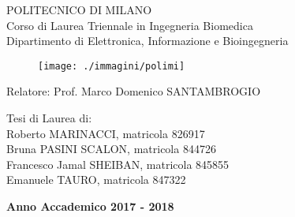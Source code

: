 \documentclass[/../main.tex]{subfiles}
\begin{document}
\thispagestyle{empty}
\vspace*{-2.5cm} %
\vspace*{0.5cm}

\begin{center}
\large
POLITECNICO DI MILANO\\
\normalsize
Corso di Laurea Triennale in Ingegneria Biomedica\\
Dipartimento di Elettronica, Informazione e Bioingegneria

\vspace*{1cm}
\begin{figure}[htbp]
\begin{center}
\texttt{[image: ./immagini/polimi]}
\end{center}
\end{figure}
\vspace*{0.7cm}

\LARGE
{}

\end{center}

\vspace*{1cm} 

\begin{flushleft}
Relatore: Prof. Marco Domenico SANTAMBROGIO\\
\end{flushleft}

\begin{flushright}
Tesi di Laurea di:\\
Roberto MARINACCI, matricola 826917 \\
Bruna PASINI SCALON, matricola 844726 \\
Francesco Jamal SHEIBAN, matricola 845855 \\
Emanuele TAURO, matricola 847322 \\

\end{flushright}



\vspace*{1.0cm}

\begin{center}
\textbf{Anno Accademico 2017 - 2018}
\end{center}

\restoregeometry
\end{document}
